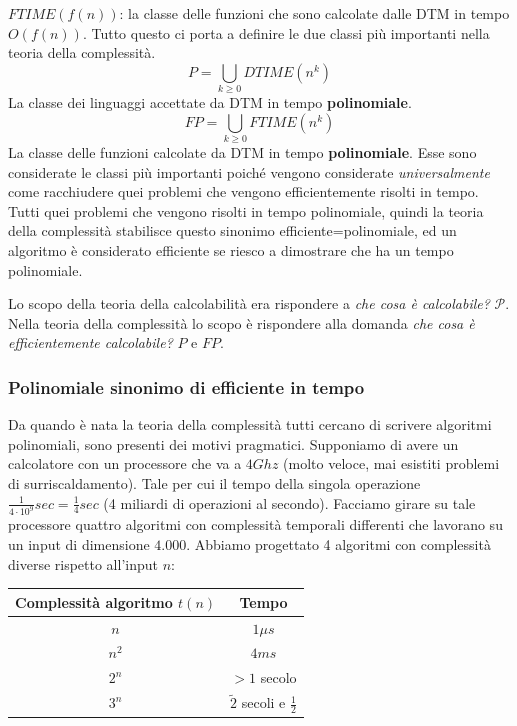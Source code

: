 \documentclass{article}
\begin{document}
$FTIME(f(n))$: la classe delle funzioni che sono calcolate dalle DTM in tempo $O(f(n))$. Tutto
questo ci porta a definire le due classi più importanti nella teoria della complessità.\mbox{}\newline
$$P=\bigcup_{k\geq 0}DTIME(n^k)$$
La classe dei linguaggi accettate da DTM in tempo \textbf{polinomiale}.
$$FP=\bigcup_{k\geq 0}FTIME(n^k)$$
La classe delle funzioni calcolate da DTM in tempo \textbf{polinomiale}.
Esse sono considerate le classi più importanti poiché vengono considerate \textit{universalmente} come
racchiudere quei problemi che vengono efficientemente risolti in tempo. Tutti quei problemi
che vengono risolti in tempo polinomiale, quindi la teoria della complessità stabilisce
questo sinonimo efficiente=polinomiale, ed un algoritmo è considerato efficiente
se riesco a dimostrare che ha un tempo polinomiale.

Lo scopo della teoria della calcolabilità era rispondere a \textit{che cosa è calcolabile?}
$\mathcal{P}$. Nella teoria della complessità lo scopo è rispondere alla domanda
\textit{che cosa è efficientemente calcolabile?} $P$ e $FP$.

\subsubsection{Polinomiale sinonimo di efficiente in tempo}
Da quando è nata la teoria della complessità tutti cercano di scrivere algoritmi
polinomiali, sono presenti dei motivi pragmatici. Supponiamo di avere un calcolatore
con un processore che va a $4Ghz$ (molto veloce, mai esistiti problemi di surriscaldamento).
Tale per cui il tempo della singola operazione $\frac{1}{4\cdot 10^9}sec=\frac{1}{4}sec$ (4
miliardi di operazioni al secondo).
Facciamo girare su tale processore quattro algoritmi con complessità temporali differenti che lavorano su un
input di dimensione $4.000$. Abbiamo progettato 4 algoritmi con complessità diverse rispetto
all'input $n$:
\begin{center}
    \begin{tabular}{c|c}
        Complessità algoritmo $t(n)$ & Tempo                             \\
        \midrule
        $n$                          & $1\mu s$                          \\
        $n^2$                        & $4ms$                             \\
        $2^n$                        & $>1$ secolo                       \\
        $3^n$                        & $\tilde 2$ secoli e $\frac{1}{2}$
    \end{tabular}
\end{center}
\end{document}
